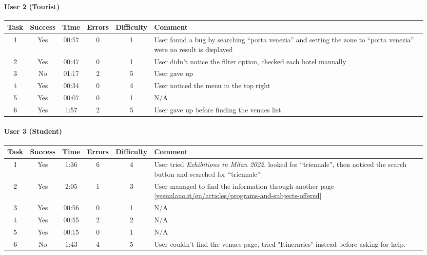 \begin{small}
\paragraph{User 2 (Tourist)}
\begin{tabularx}{\linewidth}{c c c c c X}
    \toprule
    \textbf{Task} & \textbf{Success} & \textbf{Time}
     & \textbf{Errors} & \textbf{Difficulty} & \textbf{Comment} \\
    \midrule
    1 & Yes & 00:57 & 0 & 1 & User found a bug by searching ``porta venezia'' and setting the zone to ``porta venezia'' were no result is displayed \\ \midrule
    2 & Yes & 00:47 & 0 & 1 & User didn't notice the filter option, checked each hotel manually \\ \midrule
    3 & No & 01:17 & 2 & 5 & User gave up \\ \midrule
    4 & Yes & 00:34 & 0 & 4 & User noticed the menu in the top right \\ \midrule
    5 & Yes & 00:07 & 0 & 1 & N/A \\ \midrule
    6 & Yes & 1:57 & 2 & 5 & User gave up before finding the venues list \\  \bottomrule
\end{tabularx}

\paragraph{User 3 (Student)}
\begin{tabularx}{\linewidth}{c c c c c X}
    \toprule
    \textbf{Task} & \textbf{Success} & \textbf{Time}
     & \textbf{Errors} & \textbf{Difficulty} & \textbf{Comment} \\
    \midrule
    1 & Yes & 1:36 & 6 & 4 & User tried \emph{Exhibitions in Milan 2022}, looked for ``triennale'', then noticed the search button and searched for ``triennale'' \\ \midrule
    2 & Yes & 2:05 & 1 & 3 & User managed to find the information through another page [\href{https://www.yesmilano.it/en/articles/programs-and-subjects-offered}{yesmilano.it/en/articles/programs-and-subjects-offered}] \\ \midrule
    3 & Yes & 00:56 & 0 & 1 & N/A \\ \midrule
    4 & Yes & 00:55 & 2 & 2 & N/A \\ \midrule
    5 & Yes & 00:15 & 0 & 1 & N/A \\ \midrule
    6 & No & 1:43 & 4 & 5 & User couldn't find the venues page, tried "Itineraries" instead before asking for help. \\  \bottomrule
\end{tabularx}


\end{small}
